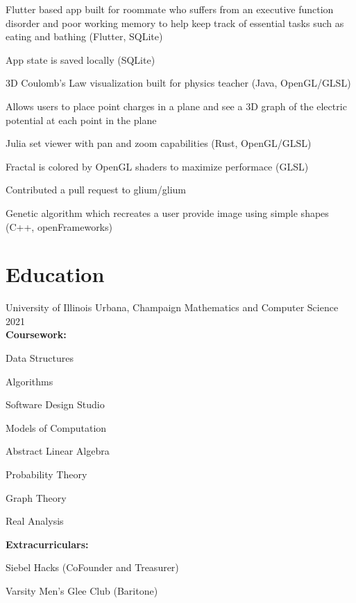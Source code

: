 \documentclass[hidelinks]{scrartcl}
\begin{document}
{
    \item Flutter based app built for roommate who suffers from an executive 
        function disorder and poor working memory to help keep track of essential 
        tasks such as eating and bathing (Flutter, SQLite)
    \item App state is saved locally (SQLite)
}
%
{
    \item 3D Coulomb's Law visualization built for physics teacher (Java, OpenGL/GLSL)
    \item Allows users to place point charges in a plane and see a 3D graph of the electric potential at each point in the plane}

{
    \item Julia set viewer with pan and zoom capabilities (Rust, OpenGL/GLSL)
    \item Fractal is colored by OpenGL shaders to maximize performace (GLSL)
    \item Contributed a pull request to glium/glium
}

{
    \item Genetic algorithm which recreates a user provide image using simple 
        shapes (C++, openFrameworks)
}



\section{Education}
\school
{University of Illinois}
{Urbana, Champaign}
{Mathematics and Computer Science}
{2021}
\\
\textbf{Coursework:} 
\begin{citemize*}
    \item[] Data Structures 
    \item Algorithms 
    \item Software Design Studio 
    \item Models of Computation 
    \item Abstract Linear Algebra 
    \item Probability Theory 
    \item Graph Theory 
    \item Real Analysis 
\end{citemize*}

\textbf{Extracurriculars:} 
\begin{citemize*}
    \item[] Siebel Hacks (CoFounder and Treasurer) 
    \item Varsity Men's Glee Club (Baritone)
\end{citemize*}
\end{document}
